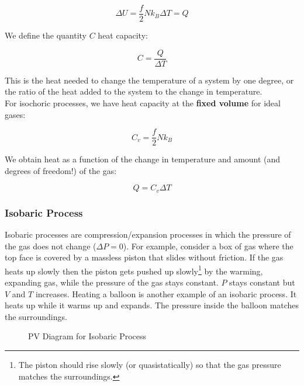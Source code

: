 $$\Delta U=\frac{f}{2}Nk_B\Delta T=Q$$

We define the quantity $C$ heat capacity:

$$C=\frac{Q}{\Delta T}$$

This is the heat needed to change the temperature of a system by one degree, or the ratio of the heat added to the system to the change in temperature. \\

For isochoric processes, we have heat capacity at the \textbf{fixed volume} for ideal gases:

$$C_v=\frac{f}{2}Nk_B$$

We obtain heat as a function of the change in temperature and amount (and degrees of freedom!) of the gas:

$$Q=C_v \Delta T$$

\subsubsection{Isobaric Process}

Isobaric processes are compression/expansion processes in which the pressure of the gas does not change ($\Delta P = 0$). For example, consider a box of gas where the top face is covered by a massless piston that slides without friction. If the gas heats up slowly then the piston gets pushed up slowly\footnote{The piston should rise slowly (or quasistatically) so that the gas pressure matches the surroundings.} by the warming, expanding gas, while the pressure of the gas stays constant. $P$ stays constant but $V$ and $T$ increases. Heating a balloon is another example of an isobaric process. It heats up while it warms up and expands. The pressure inside the balloon matches the surroundings.

\begin{figure}[H]
	\centering
	\caption{PV Diagram for Isobaric Process}
\end{figure}

